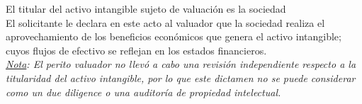 El titular del activo intangible sujeto de valuación es  la sociedad \textcolor{principal}{\empresaSolicitante}\\

El solicitante le declara en este acto al valuador que la sociedad 
\textcolor{principal}{\empresaSolicitante} realiza el aprovechamiento de los beneficios econ\'omicos que genera el activo intangible; cuyos flujos de efectivo se reflejan en los estados financieros.\\

\textit{\underline{Nota}: El perito valuador no llev\'o a cabo una revisi\'on independiente respecto a la titularidad del activo intangible, por lo que este dictamen no se puede considerar como un due diligence o una auditor\'ia de propiedad intelectual.}